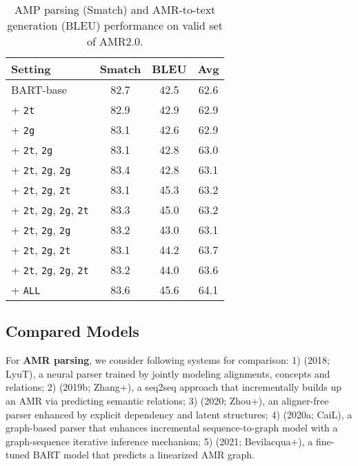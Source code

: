 \documentclass[11pt]{article}
\begin{document}
\begin{table}[!t]
	\centering
	\small
	\begin{tabular}{lccc}
		\toprule
		\textbf{Setting} &Smatch &BLEU &Avg\\
		\midrule
		BART-base  &82.7 &42.5 &62.6 \\
        + \texttt{2t} &82.9 &42.9 &62.9 \\
		+ \texttt{2g} &83.1 &42.6 &62.9 \\
		+ \texttt{2t}, \texttt{2g} &83.1 &42.8 &63.0 \\
		+ \texttt{2t}, \texttt{2g}, \texttt{2g} &83.4 & 42.8 & 63.1 \\
		+ \texttt{2t}, \texttt{2g}, \texttt{2t} &83.1 &45.3 &63.2 \\
		+ \texttt{2t}, \texttt{2g}, \texttt{2g}, \texttt{2t} &83.3 &45.0 &63.2 \\
		+ \texttt{2t}, \texttt{2g},
		\texttt{2g}
		&83.2 &43.0 &63.1 \\
		+ \texttt{2t}, \texttt{2g},
		\texttt{2t}
		&83.1 &44.2 &63.7 \\
		+ \texttt{2t}, \texttt{2g},
		\texttt{2g}, 
		\texttt{2t} & 83.2 &44.0 &63.6 \\
+ \texttt{ALL} &83.6 &45.6 &64.1 \\
		\bottomrule
	\end{tabular}
	\caption{AMP parsing (Smatch) and AMR-to-text generation (BLEU) performance on valid set of AMR2.0.}
	\label{tab:dev-exp}
\end{table}



\subsection{Compared Models}
For \textbf{AMR parsing}, we consider following systems for comparison: 1) \citeauthor{TitovL18} (2018; LyuT), a neural parser trained by jointly modeling alignments, concepts and relations;
2) \citeauthor{zhang-etal-2019-broad} (2019b; Zhang+), a seq2seq approach that incrementally builds up an AMR via predicting semantic relations;
3) \citeauthor{zhou2020amr} (2020; Zhou+), an aligner-free parser enhanced by explicit dependency and latent structures;
4) \citeauthor{cai-lam-2020-amr} (2020a; CaiL), a graph-based parser that enhances incremental sequence-to-graph model with a graph-sequence iterative inference mechanism;
5) \citeauthor{Bevilacqua_Blloshmi_Navigli_2021} (2021; Bevilacqua+), a fine-tuned BART model that predicts a linearized AMR graph.
\end{document}

